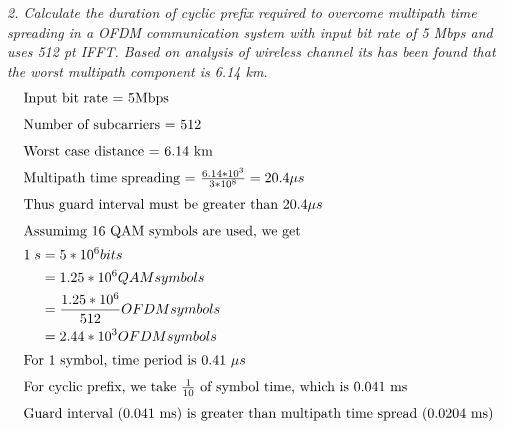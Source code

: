 \documentclass[a4paper]{article}
\begin{document}
	\bigskip
	\textit{2. Calculate the duration of cyclic prefix required to overcome multipath time spreading in a OFDM communication system with input bit rate of 5 Mbps and uses 512 pt IFFT. Based on analysis of wireless channel its has been found that the worst multipath component is 6.14 km.}
	\begin{align*}
	\shortintertext{Input bit rate = 5Mbps}
	\shortintertext{Number of subcarriers = 512}
	\shortintertext{Worst case distance = 6.14 km}
	\shortintertext{Multipath time spreading = $\frac{6.14*10^3}{3*10^8} = 20.4 \mu s$}
	\shortintertext{Thus guard interval must be greater than $20.4 \mu s$}
	\intertext{Assumimg 16 QAM symbols are used, we get}
	1 \;s & = 5 * 10^6 bits\\
	& = 1.25 * 10^6 QAM symbols\\
	& = \frac{1.25 * 10^6}{512} OFDM symbols\\
	& = 2.44 * 10^3 OFDM symbols\\
	\shortintertext{For 1 symbol, time period is 0.41 $\mu s$}
	\shortintertext{For cyclic prefix, we take  $\frac{1}{10}$ of symbol time, which is 0.041 ms}
	\shortintertext{Guard interval (0.041 ms) is greater than multipath time spread (0.0204 ms)}
	\end{align*}
	
\end{document}
